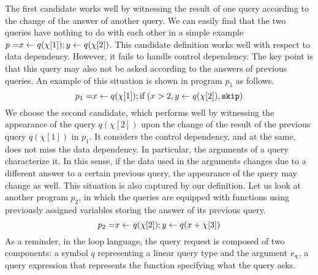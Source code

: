    The first candidate works well by witnessing the result of one query according to the change of the answer of another query. We can easily find that the two queries have nothing to do with each other in a simple example   
     $ p = \mathrel{ x \leftarrow q(\chi[1]) } ; \mathrel{ y \leftarrow q(\chi[2]) }$. This candidate definition works well with respect to data dependency. However, it fails to handle control dependency. The key point is that this query may also not be asked according to the answers of previous queries. An example of this situation is shown in program $p_1$ as follows.
      \[
      p_1 = \mathrel{ x \leftarrow q(\chi[1]) } ; \mbox{if\;}( x > 2 ,\mathrel{ y \leftarrow q(\chi[2]) }, \mathtt{skip} )
   \]
   We choose the second candidate, which performs well by witnessing the appearance of the query $q(\chi[2])$ upon the change of the result of the previous query $q(\chi[1])$ in $p_1$. It considers the control dependency, and at the same, does not miss the data dependency. In particular, the arguments of a query characterize it. In this sense, if the data used in the arguments changes due to a different answer to a certain previous query, the appearance of the query may change as well. This situation is also captured by our definition. Let us look at another program $p_2$, in which the queries are equipped with functions using previously assigned variables storing the answer of its previous query.
    \[
      p_2 = \mathrel{ x \leftarrow q(\chi[2]) } ; \mathrel{ y \leftarrow q(x+\chi[3]) }
   \]
    As a reminder, in the {loop} language, the query request is composed of two components: a symbol $q$ representing a linear query type and the argument $e_q$, a query expression that represents the function specifying what the query asks. 
   
